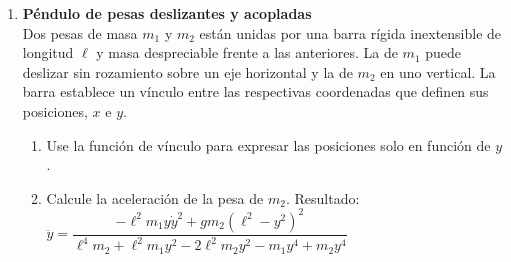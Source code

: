 \documentclass[11pt, spanish, a4paper, twoside]{article}
\begin{document}
\begin{enumerate}
		
	\item 
	\begin{minipage}[t][2.3cm]{0.75\textwidth}
		\textbf{Péndulo de pesas deslizantes y acopladas}\\ 
		Dos pesas de masa \(m_1\) y \(m_2\) están unidas por una barra rígida inextensible de longitud \(\ell\) y masa despreciable frente a las anteriores.
		La de \(m_1\) puede deslizar sin rozamiento sobre un eje horizontal y la de \(m_2\) en uno vertical.
		La barra establece un vínculo entre las respectivas coordenadas que definen sus posiciones, \(x\) e \(y\).
	\end{minipage}
	\begin{minipage}[c][1cm][t]{0.25\textwidth}
		
	\end{minipage}
	\begin{enumerate}
		\item Use la función de vínculo para expresar las posiciones solo en función de \(y\).
		\item Calcule la aceleración de la pesa de \(m_2\). %
		Resultado:
			$\ddot{y} = 
			\dfrac{- \ell^{2} m_{1} y \dot{y}^{2} + g m_{2} \left(\ell^{2} - y^{2}\right)^{2}}{\ell^{4} m_{2} + \ell^{2} m_{1} y^{2} - 2 \ell^{2} m_{2} y^{2} - m_{1} y^{4} + m_{2} y^{4}}$
			\qquad
	\end{enumerate}
	


\end{enumerate}
\end{document}
